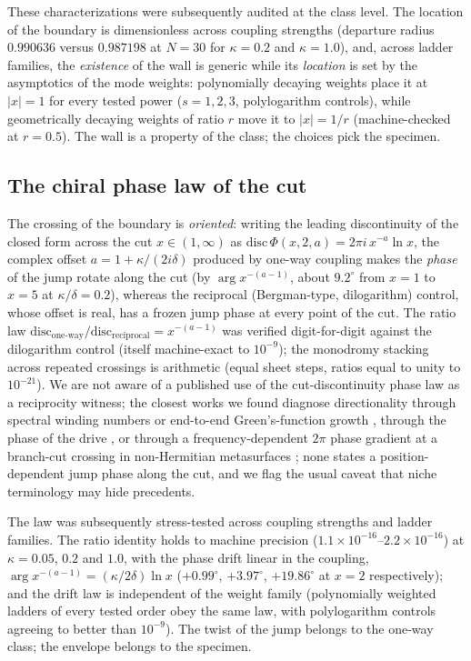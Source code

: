 \documentclass[11pt,a4paper]{article}
\begin{document}
These characterizations were subsequently audited at the class level.
The location of the boundary is dimensionless across coupling strengths
(departure radius $0.990636$ versus $0.987198$ at $N = 30$ for
$\kappa = 0.2$ and $\kappa = 1.0$), and, across ladder families, the
\emph{existence} of the wall is generic while its \emph{location} is set
by the asymptotics of the mode weights: polynomially decaying weights
place it at $|x| = 1$ for every tested power ($s = 1, 2, 3$, polylogarithm
controls), while geometrically decaying weights of ratio $r$ move it to
$|x| = 1/r$ (machine-checked at $r = 0.5$). The wall is a property of the
class; the choices pick the specimen.

\subsection{The chiral phase law of the cut}
\label{sec:chiral}

The crossing of the boundary is
\emph{oriented}: writing the leading discontinuity of the closed form
across the cut $x \in (1,\infty)$ as
$\mathrm{disc}\,\Phi(x,2,a) = 2\pi i\, x^{-a} \ln x$, the complex offset
$a = 1 + \kappa/(2i\delta)$ produced by one-way coupling makes the
\emph{phase} of the jump rotate along the cut (by
$\arg x^{-(a-1)}$, about $9.2^\circ$ from $x=1$ to $x=5$ at
$\kappa/\delta = 0.2$), whereas the reciprocal (Bergman-type,
dilogarithm) control, whose offset is real, has a frozen jump phase at
every point of the cut. The ratio law
$\mathrm{disc}_{\text{one-way}}/\mathrm{disc}_{\text{reciprocal}}
= x^{-(a-1)}$ was verified digit-for-digit against the dilogarithm
control (itself machine-exact to $10^{-9}$); the monodromy stacking
across repeated crossings is arithmetic (equal sheet steps, ratios equal
to unity to $10^{-21}$). We are not aware of a published use of the
cut-discontinuity phase law as a reciprocity witness; the closest works
we found diagnose directionality through spectral winding numbers or
end-to-end Green's-function growth \cite{HuWang2023}, through the phase
of the drive \cite{McDonald2018}, or through a frequency-dependent
$2\pi$ phase gradient at a branch-cut crossing in non-Hermitian
metasurfaces \cite{Colom2023}; none states a position-dependent jump
phase along the cut, and we flag the usual caveat that niche
terminology may hide precedents.

The law was subsequently stress-tested across coupling strengths and
ladder families. The ratio identity holds to machine precision
($1.1\times10^{-16}$--$2.2\times10^{-16}$) at $\kappa = 0.05$, $0.2$ and
$1.0$, with the phase drift linear in the coupling,
$\arg x^{-(a-1)} = (\kappa/2\delta)\ln x$
($+0.99^\circ$, $+3.97^\circ$, $+19.86^\circ$ at $x = 2$ respectively);
and the drift law is independent of the weight family (polynomially
weighted ladders of every tested order obey the same law, with
polylogarithm controls agreeing to better than $10^{-9}$). The twist of
the jump belongs to the one-way class; the envelope belongs to the
specimen.
\end{document}
